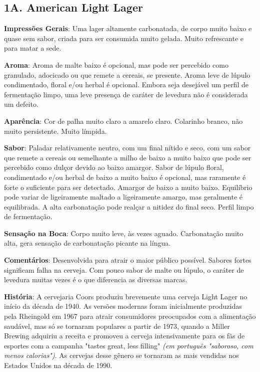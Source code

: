 \subsection*{1A. American Light Lager}
\textbf{Impressões Gerais}: Uma lager altamente carbonatada, de corpo muito baixo e quase sem sabor, criada para ser consumida muito gelada. Muito refrescante e para matar a sede.

\textbf{Aroma}: Aroma de malte baixo é opcional, mas pode ser percebido como granulado, adocicado ou que remete a cereais, se presente. Aroma leve de lúpulo condimentado, floral e/ou herbal é opcional. Embora seja desejável um perfil de fermentação limpo, uma leve presença de caráter de levedura não é considerada um defeito.

\textbf{Aparência}: Cor de palha muito claro a amarelo claro. Colarinho branco, não muito persistente. Muito límpida.

\textbf{Sabor}: Paladar relativamente neutro, com um final nítido e seco, com um sabor que remete a cereais ou semelhante a milho de baixo a muito baixo que pode ser percebido como dulçor devido ao baixo amargor. Sabor de lúpulo floral, condimentado e/ou herbal de baixo a muito baixo é opcional, mas raramente é forte o suficiente para ser detectado. Amargor de baixo a muito baixo. Equilíbrio pode variar de ligeiramente maltado a ligeiramente amargo, mas geralmente é equilibrada. A alta carbonatação pode realçar a nitidez do final seco. Perfil limpo de fermentação.

\textbf{Sensação na Boca}: Corpo muito leve, às vezes aguado. Carbonatação muito alta, gera sensação de carbonatação picante na língua.

\textbf{Comentários}: Desenvolvida para atrair o maior público possível. Sabores fortes significam falha na cerveja. Com pouco sabor de malte ou lúpulo, o caráter de levedura muitas vezes é o que diferencia as diversas marcas.

\textbf{História}: A cervejaria Coors produziu brevemente uma cerveja Light Lager no início da década de 1940. As versões modernas foram inicialmente produzidas pela Rheingold em 1967 para atrair consumidores preocupados com a alimentação saudável, mas só se tornaram populares a partir de 1973, quando a Miller Brewing adquiriu a receita e promoveu a cerveja intensivamente para os fãs de esportes com a campanha "tastes great, less filling" \textit{(em português "saboroso, com menos calorias")}. As cervejas desse gênero se tornaram as mais vendidas nos Estados Unidos na década de 1990.


